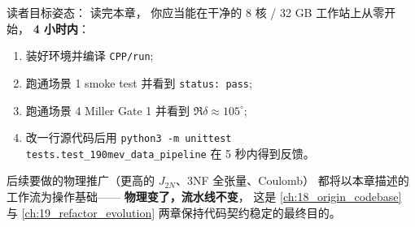 读者目标姿态：
读完本章，
你应当能在干净的 8 核 / 32 GB 工作站上从零开始，
\textbf{4 小时内}：
\begin{enumerate}
  \item 装好环境并编译 \texttt{CPP/run};
  \item 跑通场景 1 smoke test 并看到 \texttt{status: pass};
  \item 跑通场景 4 Miller Gate 1 并看到 $\Re \delta \approx 105^\circ$;
  \item 改一行源代码后用 \texttt{python3 -m unittest tests.test\_190mev\_data\_pipeline}
        在 5 秒内得到反馈。
\end{enumerate}
后续要做的物理推广（更高的 $J_{2N}$、3NF 全张量、Coulomb）
都将以本章描述的工作流为操作基础——
\textbf{物理变了，流水线不变}，
这是 \cref{ch:18_origin_codebase} 与 \cref{ch:19_refactor_evolution}
两章保持代码契约稳定的最终目的。

